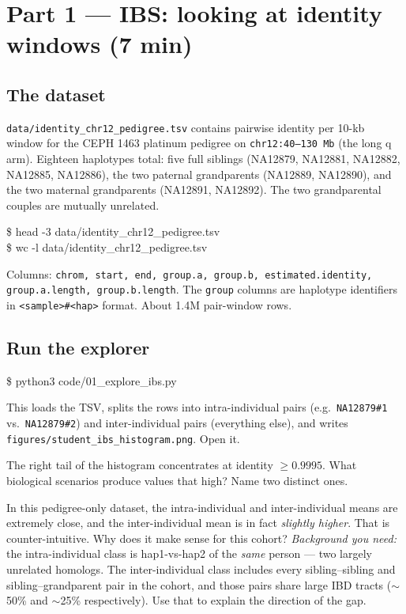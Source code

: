 \documentclass[11pt]{article}
\begin{document}
\section{Part 1 --- IBS: looking at identity windows (7 min)}

\subsection*{The dataset}

\texttt{data/identity\_chr12\_pedigree.tsv} contains pairwise identity per
10-kb window for the CEPH 1463 platinum pedigree on
\texttt{chr12:40--130\,Mb} (the long q arm). Eighteen haplotypes total:
five full siblings (NA12879, NA12881, NA12882, NA12885, NA12886), the
two paternal grandparents (NA12889, NA12890), and the two maternal
grandparents (NA12891, NA12892). The two grandparental couples are
mutually unrelated.

\begin{cmd}
\$ head -3 data/identity\_chr12\_pedigree.tsv \\
\$ wc -l data/identity\_chr12\_pedigree.tsv
\end{cmd}

Columns: \texttt{chrom, start, end, group.a, group.b, estimated.identity,
group.a.length, group.b.length}. The \texttt{group} columns are haplotype
identifiers in \texttt{<sample>\#<hap>} format. About 1.4M pair-window rows.

\subsection*{Run the explorer}

\begin{cmd}
\$ python3 code/01\_explore\_ibs.py
\end{cmd}

This loads the TSV, splits the rows into intra-individual pairs
(e.g.\ \texttt{NA12879\#1} vs.\ \texttt{NA12879\#2}) and inter-individual
pairs (everything else), and writes
\texttt{figures/student\_ibs\_histogram.png}. Open it.

\begin{quest}[1.1]
The right tail of the histogram concentrates at identity $\ge 0.9995$.
What biological scenarios produce values that high? Name two distinct
ones.
\end{quest}

\begin{quest}[1.2]
In this pedigree-only dataset, the intra-individual and inter-individual
means are extremely close, and the inter-individual mean is in fact
\emph{slightly higher}. That is counter-intuitive. Why does it make sense
for this cohort? \emph{Background you need:} the intra-individual class
is hap1-vs-hap2 of the \emph{same} person --- two largely unrelated
homologs. The inter-individual class includes every sibling--sibling and
sibling--grandparent pair in the cohort, and those pairs share large IBD
tracts ($\sim$50\% and $\sim$25\% respectively). Use that to explain the
direction of the gap.
\end{quest}
\end{document}
